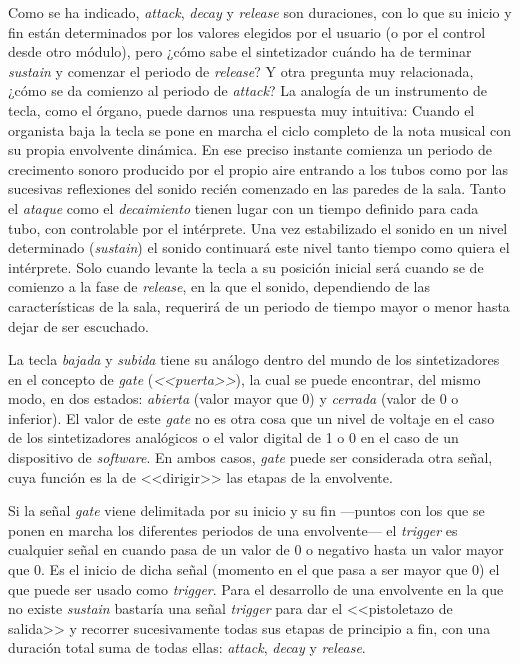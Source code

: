 Como se ha indicado, \textit{attack}, \textit{decay} y \textit{release} son duraciones, con lo que su inicio y fin están determinados por los valores elegidos por el usuario (o por el control desde otro módulo), pero ¿cómo sabe el sintetizador cuándo ha de terminar \textit{sustain} y comenzar el periodo de \textit{release}? Y otra pregunta muy relacionada, ¿cómo se da comienzo al periodo de \textit{attack}? La analogía de un instrumento de tecla, como el órgano, puede darnos una respuesta muy intuitiva: Cuando el organista baja la tecla se pone en marcha el ciclo completo de la nota musical con su propia envolvente dinámica. En ese preciso instante comienza un periodo de crecimento sonoro producido por el propio aire entrando a los tubos como por las sucesivas reflexiones del sonido recién comenzado en las paredes de la sala. Tanto el \textit{ataque} como el \textit{decaimiento} tienen lugar con un tiempo definido para cada tubo, con controlable por el intérprete. Una vez estabilizado el sonido en un nivel determinado (\textit{sustain}) el sonido continuará este nivel tanto tiempo como quiera el intérprete. Solo cuando levante la tecla a su posición inicial será cuando se de comienzo a la fase de \textit{release}, en la que el sonido, dependiendo de las características de la sala, requerirá de un periodo de tiempo mayor o menor hasta dejar de ser escuchado.

La tecla \textit{bajada} y \textit{subida} tiene su análogo dentro del mundo de los sintetizadores en el concepto de \textit{gate} (\textit{<<puerta>>}), la cual se puede encontrar, del mismo modo, en dos estados: \textit{abierta} (valor mayor que 0) y \textit{cerrada} (valor de 0 o inferior). El valor de este \textit{gate} no es otra cosa que un nivel de voltaje en el caso de los sintetizadores analógicos o el valor digital de 1 o 0 en el caso de un dispositivo de \textit{software}. En ambos casos, \textit{gate} puede ser considerada otra señal, cuya función es la de <<dirigir>> las etapas de la envolvente. 

Si la señal \textit{gate} viene delimitada por su inicio y su fin ---puntos con los que se ponen en marcha los diferentes periodos de una envolvente--- el \textit{trigger} es cualquier señal en cuando pasa de un valor de 0 o negativo hasta un valor mayor que 0. Es el inicio de dicha señal (momento en el que pasa a ser mayor que 0) el que puede ser usado como \textit{trigger}. Para el desarrollo de una envolvente en la que no existe \textit{sustain} bastaría una señal \textit{trigger} para dar el <<pistoletazo de salida>> y recorrer sucesivamente todas sus etapas de principio a fin, con una duración total suma de todas ellas: \textit{attack}, \textit{decay} y \textit{release}. 


